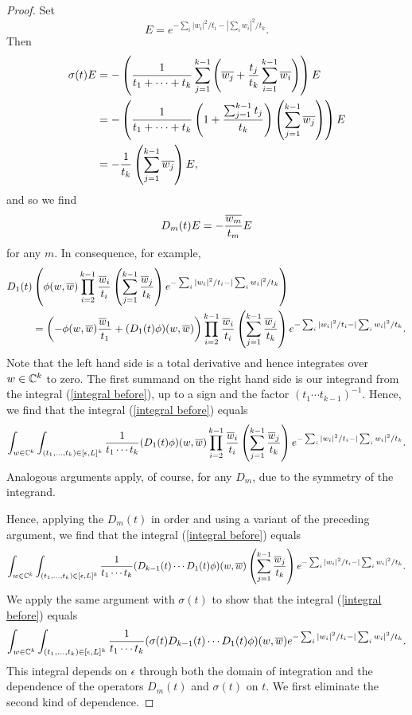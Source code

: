\begin{proof}
Set
\[
E = e^{- \sum_i |w_i|^2 / t_i - |\sum_i w_i|^2/t_k }.
\]
Then
\begin{align*}
\sigma(t)E 
&= -\left( 
\frac{1}{t_1 + \cdots + t_k} \sum_{j =1}^{k-1}\left( \Bar{w_j} + \frac{t_j}{t_k}\sum_{i =1}^{k-1} \Bar{w_i} \right) 
\right) 
E \\
&= -\left(\frac{1}{t_1 + \cdots + t_k} \left(1 + \frac{\sum_{j=1}^{k-1} t_j}{t_k}\right)\left(\sum_{j =1}^{k-1} \Bar{w_j}\right) 
\right) 
E \\
&= -\frac{1}{t_k}\left(\sum_{j =1}^{k-1} \Bar{w_j}\right) E,
\end{align*}
and so we find
\[
D_m(t) E = - \frac{\Bar{w_m}}{t_m} E
\]
for any $m$.
In consequence, for example,
\begin{align*}
D_1 (t) &
\left(
\phi(w,\Bar{w}) 
\prod_{i=2}^{k-1} \frac{\Bar{w}_i}{t_i}
\left(\sum_{j =1}^{k-1} \frac{\Bar{w}_j}{t_k} \right) 
e^{- \sum_i |w_i|^2 / t_i - |\sum_i w_i|^2/t_k }
\right) \\
 & = 
 \left( 
 - \phi(w,\Bar{w}) \frac{\Bar{w}_1}{t_1} + (D_1(t) \phi)(w, \Bar{w}) 
 \right) 
\prod_{i=2}^{k-1} \frac{\Bar{w}_i}{t_i}
\left(\sum_{j =1}^{k-1} \frac{\Bar{w}_j}{t_k} \right) e^{- \sum_i |w_i|^2 / t_i - |\sum_i w_i|^2/t_k }.
\end{align*}
Note that the left hand side is a total derivative and hence integrates over $w \in \CC^k$ to zero.
The first summand on the right hand side is our integrand from the integral (\ref{integral before}), 
up to a sign and the factor $(t_1\cdots t_{k-1})^{-1}$.
Hence, we find that the integral (\ref{integral before}) equals
\[
\int_{w \in \CC^{k}} 
\int_{(t_1,\ldots,t_k) \in [\epsilon, L]^k}
\frac{1}{t_1 \cdots t_k}
(D_1(t) \phi)(w, \Bar{w}) 
\prod_{i=2}^{k-1} \frac{\Bar{w}_i}{t_i}
\left(\sum_{j =1}^{k-1} \frac{\Bar{w}_j}{t_k} \right) e^{- \sum_i |w_i|^2 / t_i - |\sum_i w_i|^2/t_k }.
\]
Analogous arguments apply, of course, for any $D_m$, due to the symmetry of the integrand.

Hence, applying the $D_m(t)$ in order and using a variant of the preceding argument, 
we find that the integral (\ref{integral before}) equals
\[
\int_{w \in \CC^{k}} 
\int_{(t_1,\ldots,t_k) \in [\epsilon, L]^k}
\frac{1}{t_1 \cdots t_k}
(D_{k-1}(t) \cdots D_1(t) \phi)(w, \Bar{w}) 
\left(\sum_{j =1}^{k-1} \frac{\Bar{w}_j}{t_k} \right) e^{- \sum_i |w_i|^2 / t_i - |\sum_i w_i|^2/t_k }.
\]
We apply the same argument with $\sigma(t)$ to show that the integral (\ref{integral before}) equals
\[
\int_{w \in \CC^{k}} 
\int_{(t_1,\ldots,t_k) \in [\epsilon, L]^k}
\frac{1}{t_1 \cdots t_k}
(\sigma(t)D_{k-1}(t) \cdots D_1(t) \phi)(w, \Bar{w}) 
e^{- \sum_i |w_i|^2 / t_i - |\sum_i w_i|^2/t_k }.
\]
This integral depends on $\epsilon$ through both the domain of integration
and the dependence of the operators $D_m(t)$ and $\sigma(t)$ on $t$.
We first eliminate the second kind of dependence.


\end{proof}
